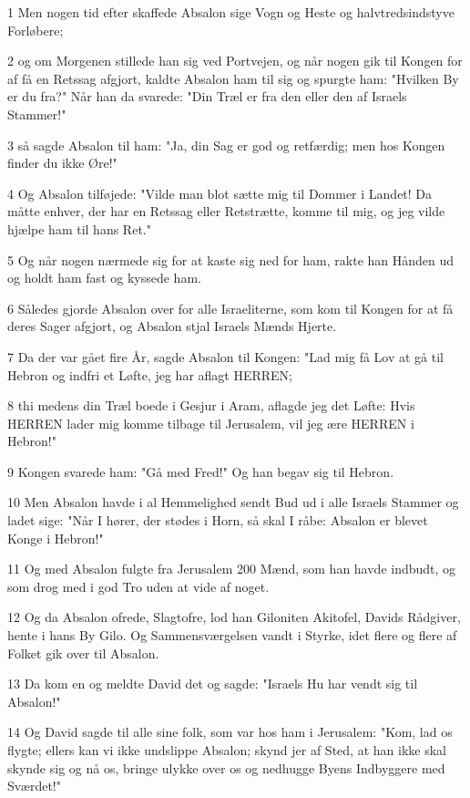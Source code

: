 \par 1 Men nogen tid efter skaffede Absalon sige Vogn og Heste og halvtredsindstyve Forløbere;
\par 2 og om Morgenen stillede han sig ved Portvejen, og når nogen gik til Kongen for af få en Retssag afgjort, kaldte Absalon ham til sig og spurgte ham: "Hvilken By er du fra?" Når han da svarede: "Din Træl er fra den eller den af Israels Stammer!"
\par 3 så sagde Absalon til ham: "Ja, din Sag er god og retfærdig; men hos Kongen finder du ikke Øre!"
\par 4 Og Absalon tilføjede: "Vilde man blot sætte mig til Dommer i Landet! Da måtte enhver, der har en Retssag eller Retstrætte, komme til mig, og jeg vilde hjælpe ham til hans Ret."
\par 5 Og når nogen nærmede sig for at kaste sig ned for ham, rakte han Hånden ud og holdt ham fast og kyssede ham.
\par 6 Således gjorde Absalon over for alle Israeliterne, som kom til Kongen for at få deres Sager afgjort, og Absalon stjal Israels Mænds Hjerte.
\par 7 Da der var gået fire År, sagde Absalon til Kongen: "Lad mig få Lov at gå til Hebron og indfri et Løfte, jeg har aflagt HERREN;
\par 8 thi medens din Træl boede i Gesjur i Aram, aflagde jeg det Løfte: Hvis HERREN lader mig komme tilbage til Jerusalem, vil jeg ære HERREN i Hebron!"
\par 9 Kongen svarede ham: "Gå med Fred!" Og han begav sig til Hebron.
\par 10 Men Absalon havde i al Hemmelighed sendt Bud ud i alle Israels Stammer og ladet sige: "Når I hører, der stødes i Horn, så skal I råbe: Absalon er blevet Konge i Hebron!"
\par 11 Og med Absalon fulgte fra Jerusalem 200 Mænd, som han havde indbudt, og som drog med i god Tro uden at vide af noget.
\par 12 Og da Absalon ofrede, Slagtofre, lod han Giloniten Akitofel, Davids Rådgiver, hente i hans By Gilo. Og Sammensværgelsen vandt i Styrke, idet flere og flere af Folket gik over til Absalon.
\par 13 Da kom en og meldte David det og sagde: "Israels Hu har vendt sig til Absalon!"
\par 14 Og David sagde til alle sine folk, som var hos ham i Jerusalem: "Kom, lad os flygte; ellers kan vi ikke undslippe Absalon; skynd jer af Sted, at han ikke skal skynde sig og nå os, bringe ulykke over os og nedhugge Byens Indbyggere med Sværdet!"
